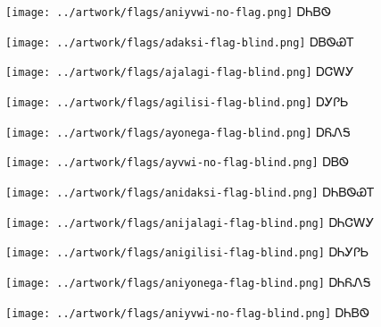 \documentclass[avery5371]{flashcards}%
\begin{document}
\begin{flashcard}{
\texttt{[image: ../artwork/flags/aniyvwi-no-flag.png]}
}\Huge ᎠᏂᏴᏫ
\end{flashcard}


\begin{flashcard}{
\texttt{[image: ../artwork/flags/adaksi-flag-blind.png]}
}\Huge ᎠᏴᏫᏯᎢ
\end{flashcard}

\begin{flashcard}{
\texttt{[image: ../artwork/flags/ajalagi-flag-blind.png]}
}\Huge ᎠᏣᎳᎩ
\end{flashcard}

\begin{flashcard}{
\texttt{[image: ../artwork/flags/agilisi-flag-blind.png]}
}\Huge ᎠᎩᎵᏏ
\end{flashcard}

\begin{flashcard}{
\texttt{[image: ../artwork/flags/ayonega-flag-blind.png]}
}\Huge ᎠᏲᏁᎦ
\end{flashcard}

\begin{flashcard}{
\texttt{[image: ../artwork/flags/ayvwi-no-flag-blind.png]}
}\Huge ᎠᏴᏫ
\end{flashcard}


\begin{flashcard}{
\texttt{[image: ../artwork/flags/anidaksi-flag-blind.png]}
}\Huge ᎠᏂᏴᏫᏯᎢ
\end{flashcard}

\begin{flashcard}{
\texttt{[image: ../artwork/flags/anijalagi-flag-blind.png]}
}\Huge ᎠᏂᏣᎳᎩ
\end{flashcard}

\begin{flashcard}{
\texttt{[image: ../artwork/flags/anigilisi-flag-blind.png]}
}\Huge ᎠᏂᎩᎵᏏ
\end{flashcard}

\begin{flashcard}{
\texttt{[image: ../artwork/flags/aniyonega-flag-blind.png]}
}\Huge ᎠᏂᏲᏁᎦ
\end{flashcard}

\begin{flashcard}{
\texttt{[image: ../artwork/flags/aniyvwi-no-flag-blind.png]}
}\Huge ᎠᏂᏴᏫ
\end{flashcard}
\end{document}
